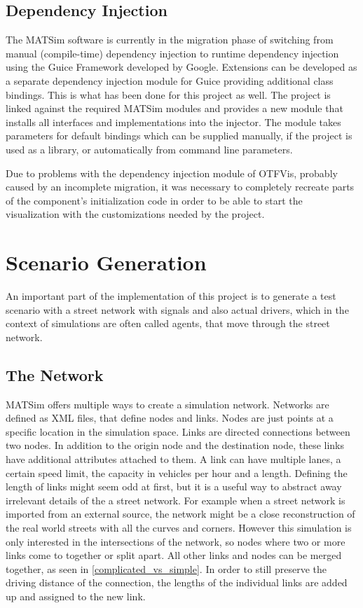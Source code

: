 \subsection*{Dependency Injection}

The MATSim software is currently in the migration phase of switching from manual (compile-time) dependency injection to runtime dependency injection using the Guice Framework developed by Google. Extensions can be developed as a separate dependency injection module for Guice providing additional class bindings. This is what has been done for this project as well. The project is linked against the required MATSim modules and provides a new module that installs all interfaces and implementations into the injector. The module takes parameters for default bindings which can be supplied manually, if the project is used as a library, or automatically from command line parameters.

Due to problems with the dependency injection module of OTFVis, probably caused by an incomplete migration, it was necessary to completely recreate parts of the component's initialization code in order to be able to start the visualization with the customizations needed by the project.

\section{Scenario Generation}
\label{scenario_generation}

An important part of the implementation of this project is to generate a test scenario with a street network with signals and also actual drivers, which in the context of simulations are often called agents, that move through the street network.

\subsection*{The Network}

MATSim offers multiple ways to create a simulation network. Networks are defined as XML files, that define nodes and links. Nodes are just points at a specific location in the simulation space. Links are directed connections between two nodes. In addition to the origin node and the destination node, these links have additional attributes attached to them. A link can have multiple lanes, a certain speed limit, the capacity in vehicles per hour and a length. Defining the length of links might seem odd at first, but it is a useful way to abstract away irrelevant details of the a street network. For example when a street network is imported from an external source, the network might be a close reconstruction of the real world streets with all the curves and corners. However this simulation is only interested in the intersections of the network, so nodes where two or more links come to together or split apart. All other links and nodes can be merged together, as seen in \autoref{complicated_vs_simple}. In order to still preserve the driving distance of the connection, the lengths of the individual links are added up and assigned to the new link.

